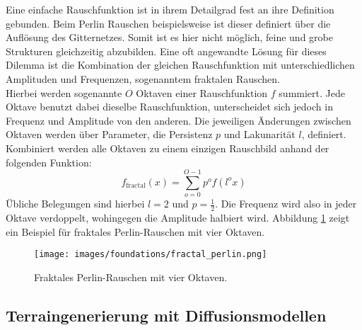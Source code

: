 Eine einfache Rauschfunktion ist in ihrem Detailgrad fest an ihre Definition gebunden. Beim Perlin Rauschen beispielsweise ist dieser definiert über die Auflösung des Gitternetzes. Somit ist es hier nicht möglich, feine und grobe Strukturen gleichzeitig abzubilden. Eine oft angewandte Lösung für dieses Dilemma ist die Kombination der gleichen Rauschfunktion mit unterschiedlichen Amplituden und Frequenzen, sogenanntem fraktalen Rauschen. \\
Hierbei werden sogenannte $O$ Oktaven einer Rauschfunktion $f$ summiert. Jede Oktave benutzt dabei dieselbe Rauschfunktion, unterscheidet sich jedoch in Frequenz und Amplitude von den anderen. Die jeweiligen Änderungen zwischen Oktaven werden über Parameter, die Persistenz $p$ und Lakunarität $l$, definiert. Kombiniert werden alle Oktaven zu einem einzigen Rauschbild anhand der folgenden Funktion:  
\begin{equation}
    f_\text{fractal}(x) = \sum_{o=0}^{O-1} p^{o}f(l^ox)
\end{equation}
Übliche Belegungen sind hierbei $l=2$ und $p=\frac{1}{2}$. Die Frequenz wird also in jeder Oktave verdoppelt, wohingegen die Amplitude halbiert wird. Abbildung \ref{fig:fractal_perlin} zeigt ein Beispiel für fraktales Perlin-Rauschen mit vier Oktaven.

\begin{figure}[ht]
    \centering
    \texttt{[image: images/foundations/fractal\_perlin.png]} 
    \caption{Fraktales Perlin-Rauschen mit vier Oktaven.}
    \label{fig:fractal_perlin}
\end{figure}

\subsection{Terraingenerierung mit Diffusionsmodellen}

